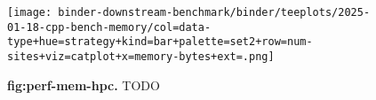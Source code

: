 \begin{figure*}

\texttt{[image: binder-downstream-benchmark/binder/teeplots/2025-01-18-cpp-bench-memory/col=data-type+hue=strategy+kind=bar+palette=set2+row=num-sites+viz=catplot+x=memory-bytes+ext=.png]}

\caption{
\textbf{fig:perf-mem-hpc.}
\footnotesize
TODO
}
\label{fig:perf-mem-hpc}
\end{figure*}
